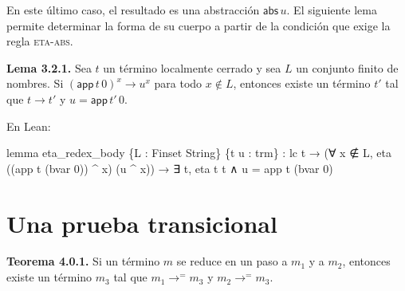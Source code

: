 \documentclass[
  spanish,
  letterpaper,
  DIV=11,
  numbers=noendperiod]{scrreprt}
\newenvironment{Shaded}{\begin{snugshade}}{\end{snugshade}}
\newcommand{\KeywordTok}[1]{\textcolor[rgb]{0.00,0.23,0.31}{\textbf{#1}}}
\newcommand{\NormalTok}[1]{\textcolor[rgb]{0.00,0.23,0.31}{#1}}
\renewcommand{\NormalTok}[1]{\textcolor[HTML]{000000}{#1}}
\renewcommand{\KeywordTok}[1]{\textcolor[HTML]{0000FF}{#1}}
\theoremstyle{remark}
\begin{document}
En este último caso, el resultado es una abstracción
\(\mathsf{abs}\,u\). El siguiente lema permite determinar la forma de su
cuerpo a partir de la condición que exige la regla \textsc{eta-abs}.

\textbf{Lema 3.2.1.} Sea \(t\) un término localmente cerrado y sea \(L\)
un conjunto finito de nombres. Si
\((\mathsf{app}\,t\,0)^x\longrightarrow u^x\) para todo \(x\notin L\),
entonces existe un término \(t'\) tal que \(t\longrightarrow t'\) y
\(u=\mathsf{app}\,t'\,0\).

En Lean:

\begin{Shaded}
\begin{Highlighting}[]
\KeywordTok{lemma}\NormalTok{ eta\_redex\_body \{L : Finset String\} \{t u : trm\} :}
\NormalTok{    lc t →}
\NormalTok{    (∀ x ∉ L, eta ((app t (bvar 0)) \^{} x) (u \^{} x)) →}
\NormalTok{    ∃ t\textquotesingle{}, eta t t\textquotesingle{} ∧ u = app t\textquotesingle{} (bvar 0)}
\end{Highlighting}
\end{Shaded}


\chapter{Una prueba transicional}\label{una-prueba-transicional}

\textbf{Teorema 4.0.1.} Si un término \(m\) se reduce en un paso a
\(m_1\) y a \(m_2\), entonces existe un término \(m_3\) tal que
\(m_1\longrightarrow^{=}m_3\) y \(m_2\longrightarrow^{=}m_3\).
\end{document}
